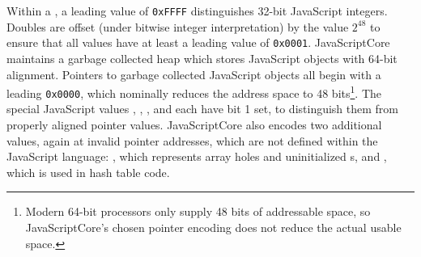 Within a , a leading value of \texttt{0xFFFF} distinguishes 32-bit JavaScript integers.
Doubles are offset (under bitwise integer interpretation) by the value $2^{48}$ to ensure that all values have at least a leading value of \texttt{0x0001}.
JavaScriptCore maintains a garbage collected heap which stores JavaScript objects with 64-bit alignment.
Pointers to garbage collected JavaScript objects all begin with a leading \texttt{0x0000}, which nominally reduces the address space to 48 bits\footnote{Modern 64-bit processors only supply 48 bits of addressable space, so JavaScriptCore's chosen pointer encoding does not reduce the actual usable space.}.
The special JavaScript values , , , and  each have bit 1 set, to distinguish them from properly aligned pointer values.
JavaScriptCore also encodes two additional values, again at invalid pointer addresses, which are not defined within the JavaScript language: , which represents array holes and uninitialized s, and , which is used in hash table code.


